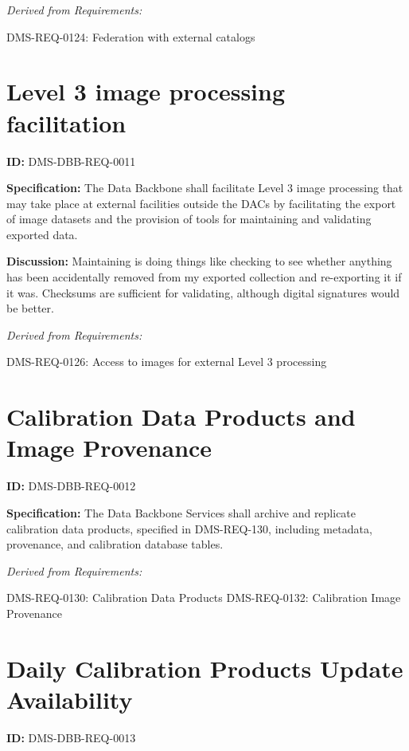 \documentclass[SE,toc,lsstdraft]{lsstdoc}
\begin{document}
\emph{Derived from Requirements:}

DMS-REQ-0124:
Federation with external catalogs \newline

\section{Level 3 image processing facilitation}

\label{DMS-DBB-REQ-0011}
\textbf{ID:} DMS-DBB-REQ-0011

\textbf{Specification:}
The Data Backbone shall facilitate Level 3 image processing that may take place at external
 facilities outside the DACs by facilitating the export of image
 datasets and the provision of tools for maintaining and validating exported data.

\textbf{Discussion:}
Maintaining is doing things like checking to see whether anything has been accidentally removed from my exported collection and re-exporting it if it was.  Checksums are sufficient for validating, although digital signatures would be better.

\emph{Derived from Requirements:}

DMS-REQ-0126:
Access to images for external Level 3 processing \newline

\section{Calibration Data Products and Image Provenance}

\label{DMS-DBB-REQ-0012}
\textbf{ID:} DMS-DBB-REQ-0012

\textbf{Specification:}
The Data Backbone Services shall archive and replicate calibration data products, specified in DMS-REQ-130, including metadata, provenance, and calibration database tables.

\emph{Derived from Requirements:}

DMS-REQ-0130:
Calibration Data Products \newline
DMS-REQ-0132:
Calibration Image Provenance \newline

\section{Daily Calibration Products Update Availability}

\label{DMS-DBB-REQ-0013}
\textbf{ID:} DMS-DBB-REQ-0013
\end{document}

